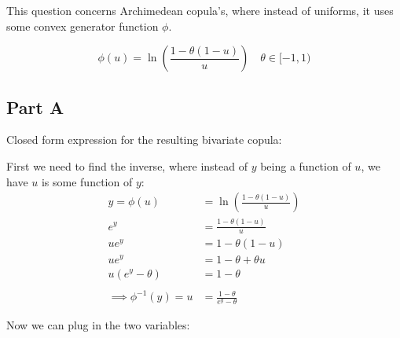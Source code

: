 \documentclass[
  oneside]{book}
\begin{document}
This question concerns Archimedean copula's, where instead of uniforms, it uses some convex generator function \(\phi\).

\[
\phi(u) = \ln \left( \frac{1-\theta(1-u)}{u} \right) \quad \theta \in [-1,1)
\]

\hypertarget{part-a-4}{%
\subsection{Part A}\label{part-a-4}}

Closed form expression for the resulting bivariate copula:

First we need to find the inverse, where instead of \(y\) being a function of \(u\), we have \(u\) is some function of \(y\):
\[
\begin{aligned}
y = \phi(u) &= \ln \left( \frac{1-\theta(1-u)}{u} \right)\\
e^{y}&= \frac{1-\theta(1-u)}{u}\\
ue^{y} &= 1-\theta(1-u)\\
ue^{y} &= 1-\theta +\theta u\\
u(e^{y}-\theta) &= 1-\theta\\
\\
\implies \phi ^{-1}(y) = u &= \frac{1-\theta}{e^{y}-\theta}
\end{aligned}
\]

Now we can plug in the two variables:
\end{document}
